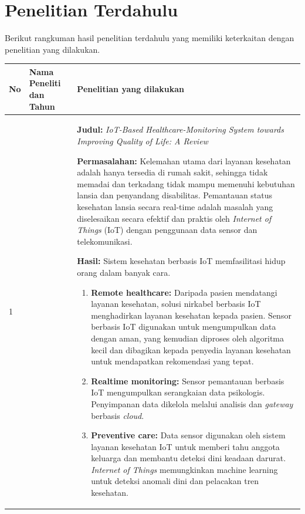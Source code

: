 \section{Penelitian Terdahulu}

\noindent Berikut rangkuman hasil penelitian terdahulu yang memiliki keterkaitan dengan penelitian yang dilakukan.

\begin{longtable}[!h]
        {
            p{}
            p{}
            p{}
        } 
        \toprule
        No & 
        Nama Peneliti dan Tahun & 
        Penelitian yang dilakukan \\ [0.5ex] 
        \midrule
        
        1
        & \textcite{inproc:abdulmalek}
        &
        \textbf{Judul:}
        \textit{IoT-Based Healthcare-Monitoring System towards Improving Quality of Life: A Review}

        \textbf{Permasalahan:}
        Kelemahan utama dari layanan kesehatan adalah hanya tersedia di rumah sakit, sehingga tidak memadai dan terkadang tidak mampu memenuhi kebutuhan lansia dan penyandang disabilitas. Pemantauan status kesehatan lansia secara real-time adalah masalah yang diselesaikan secara efektif dan praktis oleh \textit{Internet of Things} (IoT) dengan penggunaan data sensor dan telekomunikasi.

        \textbf{Hasil:}
        Sistem kesehatan berbasis IoT memfasilitasi hidup orang dalam banyak cara.
        
        \begin{enumerate}
            \item \textbf{Remote healthcare:}
            Daripada pasien mendatangi layanan kesehatan, solusi nirkabel berbasis IoT menghadirkan layanan kesehatan kepada pasien. Sensor berbasis IoT digunakan untuk mengumpulkan data dengan aman, yang kemudian diproses oleh algoritma kecil dan dibagikan kepada penyedia layanan kesehatan untuk mendapatkan rekomendasi yang tepat.

            \item \textbf{Realtime monitoring:}
            Sensor pemantauan berbasis IoT mengumpulkan serangkaian data psikologis. Penyimpanan data dikelola melalui analisis dan \textit{gateway} berbasis \textit{cloud}.
    
    
            \item \textbf{Preventive care:}
            Data sensor digunakan oleh sistem layanan kesehatan IoT untuk memberi tahu anggota keluarga dan membantu deteksi dini keadaan darurat. \textit{Internet of Things} memungkinkan machine learning untuk deteksi anomali dini dan pelacakan tren kesehatan.
        \end{enumerate}
        

\end{longtable}
